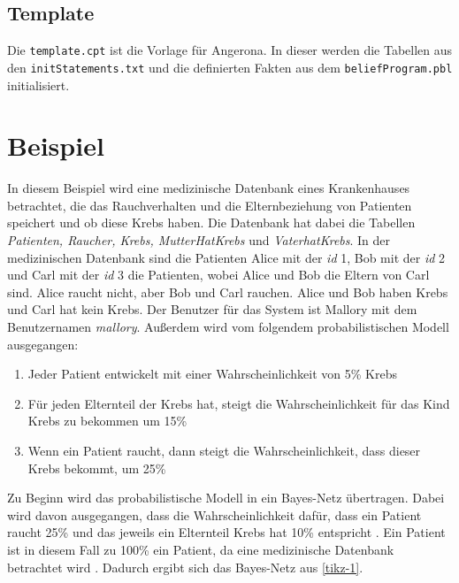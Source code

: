 \documentclass[german,version-2020-11]{uzl-thesis}
\begin{document}
\subsection{Template}
Die \texttt{template.cpt} ist die Vorlage für Angerona. In dieser werden die Tabellen aus den \texttt{initStatements.txt} und die definierten Fakten aus dem \texttt{beliefProgram.pbl} initialisiert.

\section{Beispiel} \label{chap:Beispiel}
In diesem Beispiel wird  eine medizinische Datenbank eines Krankenhauses betrachtet, die das Rauchverhalten und die Elternbeziehung von Patienten speichert und ob diese Krebs haben. Die Datenbank hat dabei die Tabellen \textit{Patienten, Raucher, Krebs, MutterHatKrebs } und \textit{VaterhatKrebs}. In der medizinischen Datenbank sind die Patienten Alice mit der \textit{id} 1, Bob mit der \textit{id} 2 und Carl mit der \textit{id} 3 die Patienten, wobei Alice und Bob die Eltern von Carl sind. Alice raucht nicht, aber Bob und Carl rauchen. Alice und Bob haben Krebs und Carl hat kein Krebs. Der Benutzer für das System ist Mallory mit dem Benutzernamen \textit{mallory}. Außerdem wird vom folgendem probabilistischen Modell ausgegangen: 
\begin{enumerate}
\item Jeder Patient entwickelt mit einer Wahrscheinlichkeit von 5\% Krebs
\item Für jeden Elternteil der Krebs hat, steigt die Wahrscheinlichkeit für das Kind Krebs zu bekommen um 15\%
\item Wenn ein Patient raucht, dann steigt die Wahrscheinlichkeit, dass dieser Krebs bekommt, um  25\%
\end{enumerate}
Zu Beginn  wird das probabilistische Modell in ein Bayes-Netz übertragen. Dabei wird davon ausgegangen, dass die Wahrscheinlichkeit dafür, dass ein Patient raucht 25\% und das jeweils ein Elternteil Krebs hat 10\% entspricht \cite{11}. Ein Patient ist in diesem Fall zu 100\% ein Patient, da eine medizinische Datenbank betrachtet wird \cite{guarnieri2017securing}. Dadurch ergibt sich das Bayes-Netz aus \autoref{tikz-1}.
\end{document}
